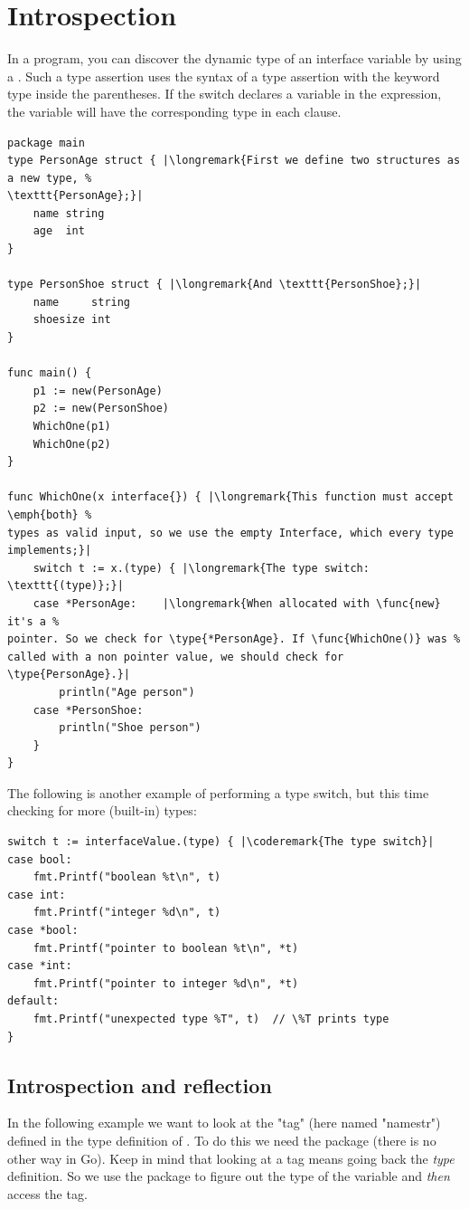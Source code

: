 \section{Introspection}
\label{sec:introspection}
In a program, you can discover the dynamic type of an interface variable
by using a .
Such a type assertion uses
the syntax of a type assertion with the keyword type inside the
parentheses. If the switch declares a variable in the expression, the
variable will have the corresponding type in each clause.
\begin{lstlisting}[caption=Dynamically find out the type]
package main
type PersonAge struct { |\longremark{First we define two structures as a new type, %
\texttt{PersonAge};}|
	name string
	age  int
}

type PersonShoe struct { |\longremark{And \texttt{PersonShoe};}|
	name     string
	shoesize int
}

func main() {
	p1 := new(PersonAge)
	p2 := new(PersonShoe)
	WhichOne(p1)
	WhichOne(p2)
}

func WhichOne(x interface{}) { |\longremark{This function must accept \emph{both} %
types as valid input, so we use the empty Interface, which every type implements;}|
	switch t := x.(type) { |\longremark{The type switch: \texttt{(type)};}|
	case *PersonAge:	|\longremark{When allocated with \func{new} it's a %
pointer. So we check for \type{*PersonAge}. If \func{WhichOne()} was %
called with a non pointer value, we should check for \type{PersonAge}.}|
		println("Age person")
	case *PersonShoe:
		println("Shoe person")
	}
}
\end{lstlisting}
\showremarks

The following is another example of performing a type switch, but this
time checking for more (built-in) types:
\begin{lstlisting}[caption=A more generic type switch]
switch t := interfaceValue.(type) { |\coderemark{The type switch}|
case bool:
    fmt.Printf("boolean %t\n", t)
case int:
    fmt.Printf("integer %d\n", t)
case *bool:
    fmt.Printf("pointer to boolean %t\n", *t)
case *int:
    fmt.Printf("pointer to integer %d\n", *t)
default:
    fmt.Printf("unexpected type %T", t)  // \%T prints type
}
\end{lstlisting}

\subsection{Introspection and reflection}
\label{subsec:introspection and reflection}
In the following example we want to look at the "tag" (here named
"namestr") defined in the
type definition of . To do this we need the
 package (there is no other way in Go). Keep in mind
that looking at a tag means going back the \emph{type} definition. So
we use the package to figure out the type of the variable
and \emph{then} access the tag.

